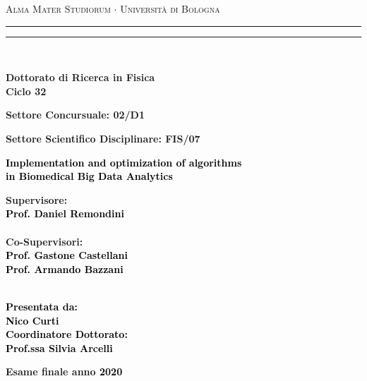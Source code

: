 \documentclass{standalone}
\begin{document}
\begin{titlepage}


\begin{center}
{{\Large{\textsc{Alma Mater Studiorum $\cdot$ Universit\`a di Bologna}}}}
\rule[0.1cm]{15.8cm}{0.1mm}
\rule[0.5cm]{15.8cm}{0.6mm}
\\\vspace{3mm}

{\small{\bf Dottorato di Ricerca in Fisica\\Ciclo 32}}

\end{center}

{\small{\bf Settore Concursuale: 02/D1}}


{\small{\bf Settore Scientifico Disciplinare: FIS/07}}

\vspace{23mm}

\begin{center}\textcolor{black}{
{\Large{\bf Implementation and optimization of algorithms\\in Biomedical Big Data Analytics}}\\
}\end{center}

\vspace{70mm} \par \noindent

\begin{minipage}[t]{\textwidth}
{\large{\bf Supervisore: \vspace{2mm}\\\textcolor{black}{
Prof. Daniel Remondini}}}\\\\
{\large{\bf Co-Supervisori: \vspace{2mm}\\\textcolor{black}{
Prof. Gastone Castellani\\
Prof. Armando Bazzani}}}\\\\
\end{minipage}


\hfill

\begin{minipage}[t]{\textwidth}\raggedleft \textcolor{black}{
{\large{\bf Presentata da:
\vspace{2mm}\\
Nico Curti}}\\
{\large{\bf Coordinatore Dottorato:
\vspace{2mm}\\
Prof.ssa Silvia Arcelli
}}}
\end{minipage}

\vspace{17mm}

\begin{center}
{\large{\bf Esame finale anno \textcolor{black}{2020}
}}
\end{center}

\end{titlepage}
\end{document}
